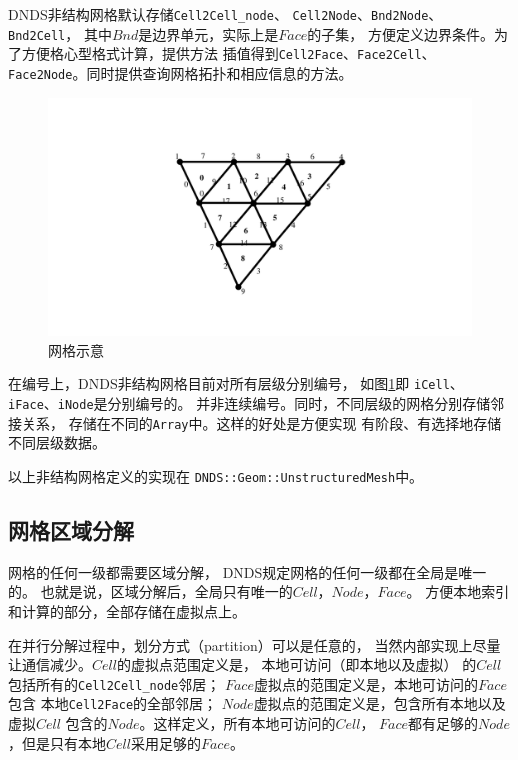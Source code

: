 \documentclass[UTF8,zihao=5]{ctexart} %
\begin{document}
DNDS非结构网格默认存储\verb|Cell2Cell_node|、
\verb|Cell2Node|、\verb|Bnd2Node|、\verb|Bnd2Cell|，
其中$Bnd$是边界单元，实际上是$Face$的子集，
方便定义边界条件。为了方便格心型格式计算，提供方法
插值得到\verb|Cell2Face|、\verb|Face2Cell|、
\verb|Face2Node|。同时提供查询网格拓扑和相应信息的方法。

\begin{figure}[htbp]
    \centering
    \includegraphics[width=12cm]{mesh_A.pdf}
    \caption{网格示意}
    \label{fig:mesh_A}
\end{figure}

在编号上，DNDS非结构网格目前对所有层级分别编号，
如图\ref{fig:mesh_A}即
\verb|iCell|、\verb|iFace|、\verb|iNode|是分别编号的。
并非连续编号。同时，不同层级的网格分别存储邻接关系，
存储在不同的\verb|Array|中。这样的好处是方便实现
有阶段、有选择地存储不同层级数据。


以上非结构网格定义的实现在
\verb|DNDS::Geom::UnstructuredMesh|中。

\subsection{网格区域分解}

网格的任何一级都需要区域分解，
DNDS规定网格的任何一级都在全局是唯一的。
也就是说，区域分解后，全局只有唯一的$Cell$，$Node$，$Face$。
方便本地索引和计算的部分，全部存储在虚拟点上。

在并行分解过程中，划分方式（partition）可以是任意的，
当然内部实现上尽量让通信减少。$Cell$的虚拟点范围定义是，
本地可访问（即本地以及虚拟）
的$Cell$包括所有的\verb|Cell2Cell_node|邻居；
$Face$虚拟点的范围定义是，本地可访问的$Face$包含
本地\verb|Cell2Face|的全部邻居；
$Node$虚拟点的范围定义是，包含所有本地以及虚拟$Cell$
包含的$Node$。这样定义，所有本地可访问的$Cell$，
$Face$都有足够的$Node$，但是只有本地$Cell$采用足够的$Face$。
\end{document}
